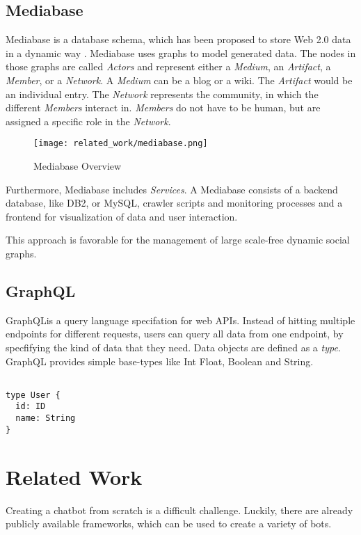 \subsection{Mediabase}
Mediabase is a database schema, which has been proposed to store Web 2.0 data in a dynamic way \cite{KlPe08}. Mediabase uses graphs to model generated data. The nodes in those graphs are called \emph{Actors} and represent either a \emph{ Medium}, an \emph{Artifact}, a \emph{Member}, or a \emph{Network}. A \emph{ Medium} can be a blog or a wiki. The \emph{Artifact} would be an individual entry. The \emph{Network} represents the community, in which the different \emph{Members} interact in. \emph{Members} do not have to be human, but are assigned a specific role in the \emph{Network}.
\begin{figure}
	\centering
	\texttt{[image: related\_work/mediabase.png]}
	\caption{Mediabase Overview \cite{Klam10e}}
\end{figure}
Furthermore, Mediabase includes \emph{Services}. A Mediabase consists of a backend database, like DB2, or MySQL, crawler scripts and monitoring processes and a frontend for visualization of data  and user interaction.

This approach is favorable for the management of large scale-free dynamic social graphs.

\subsection{GraphQL}
GraphQL\footnotemark is a query language specifation for web APIs. Instead of hitting multiple endpoints for different requests, users can query all data from one endpoint, by specfifying the kind of data that they need. Data objects are defined as a \emph{type}. GraphQL provides simple base-types like Int Float, Boolean and String.
\begin{lstlisting}[caption={Example of a GraphQL schema},captionpos=b]
    
type User {
  id: ID
  name: String
}
\end{lstlisting}


\section{Related Work} \label{lab:relWork}

Creating a chatbot from scratch is a difficult challenge. Luckily, there are already publicly available frameworks, which can be used to create a variety of bots.

